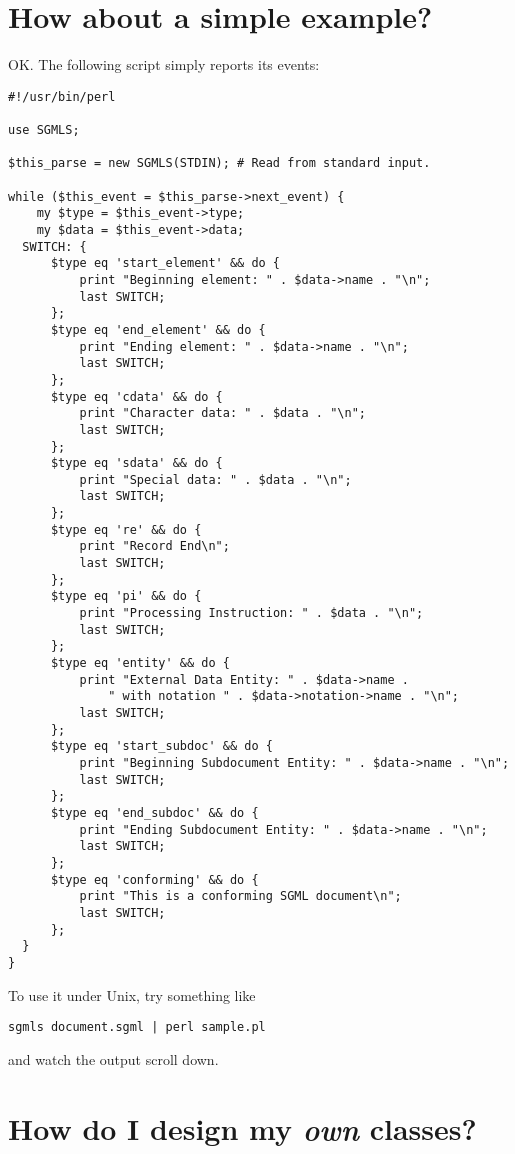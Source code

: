 \section{How about a simple example?}
\label{EXAMPLE}


OK.  The following script simply reports its events:

{\footnotesize\begin{verbatim}
#!/usr/bin/perl

use SGMLS;

$this_parse = new SGMLS(STDIN); # Read from standard input.

while ($this_event = $this_parse->next_event) {
    my $type = $this_event->type;
    my $data = $this_event->data;
  SWITCH: {
      $type eq 'start_element' && do {
          print "Beginning element: " . $data->name . "\n";
          last SWITCH;
      };
      $type eq 'end_element' && do {
          print "Ending element: " . $data->name . "\n";
          last SWITCH;
      };
      $type eq 'cdata' && do {
          print "Character data: " . $data . "\n";
          last SWITCH;
      };
      $type eq 'sdata' && do {
          print "Special data: " . $data . "\n";
          last SWITCH;
      };
      $type eq 're' && do {
          print "Record End\n";
          last SWITCH;
      };
      $type eq 'pi' && do {
          print "Processing Instruction: " . $data . "\n";
          last SWITCH;
      };
      $type eq 'entity' && do {
          print "External Data Entity: " . $data->name .
              " with notation " . $data->notation->name . "\n";
          last SWITCH;
      };
      $type eq 'start_subdoc' && do {
          print "Beginning Subdocument Entity: " . $data->name . "\n";
          last SWITCH;
      };
      $type eq 'end_subdoc' && do {
          print "Ending Subdocument Entity: " . $data->name . "\n";
          last SWITCH;
      };
      $type eq 'conforming' && do {
          print "This is a conforming SGML document\n";
          last SWITCH;
      };
  }
}

\end{verbatim}}

To use it under Unix, try something like

{\footnotesize\begin{verbatim}
sgmls document.sgml | perl sample.pl
\end{verbatim}}

and watch the output scroll down.




\section{How do I design my {\em own\/} classes?}
\label{EXTEND}


